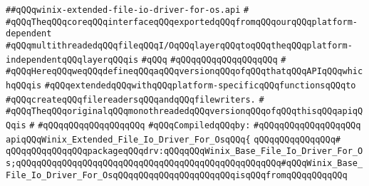 \label{src/lib/std/src/io/winix-extended-file-io-driver-for-os.api}
\verb|##qQQqwinix-extended-file-io-driver-for-os.api|\newline
\verb|#|\newline
\verb|#qQQqTheqQQqcoreqQQqinterfaceqQQqexportedqQQqfromqQQqourqQQqplatform-dependent|\newline
\verb|#qQQqmultithreadedqQQqfileqQQqI/OqQQqlayerqQQqtoqQQqtheqQQqplatform-independentqQQqlayerqQQqis|\newline
\verb|#qQQq|\newline
\verb|#qQQqqQQqqQQqqQQqqQQq|\newline
\verb|#|\newline
\verb|#qQQqHereqQQqweqQQqdefineqQQqaqQQqversionqQQqofqQQqthatqQQqAPIqQQqwhichqQQqis|\newline
\verb|#qQQqextendedqQQqwithqQQqplatform-specificqQQqfunctionsqQQqto|\newline
\verb|#qQQqcreateqQQqfilereadersqQQqandqQQqfilewriters.|\newline
\verb|#|\newline
\verb|#qQQqTheqQQqoriginalqQQqmonothreadedqQQqversionqQQqofqQQqthisqQQqapiqQQqis|\newline
\verb|#|\newline
\verb|#qQQqqQQqqQQqqQQqqQQq|\newline
\newline
\verb|#qQQqCompiledqQQqby:|\newline
\verb|#qQQqqQQqqQQqqQQqqQQq|\newline
\newline
\newline
\newline
\verb|apiqQQqWinix_Extended_File_Io_Driver_For_OsqQQq{|\newline
\verb|qQQqqQQqqQQqqQQq#|\newline
\verb|qQQqqQQqqQQqqQQqpackageqQQqdrv:qQQqqQQqWinix_Base_File_Io_Driver_For_Os;qQQqqQQqqQQqqQQqqQQqqQQqqQQqqQQqqQQqqQQqqQQqqQQqqQQq#qQQqWinix_Base_File_Io_Driver_For_OsqQQqqQQqqQQqqQQqqQQqqQQqisqQQqfromqQQqqQQqqQQq|\newline
